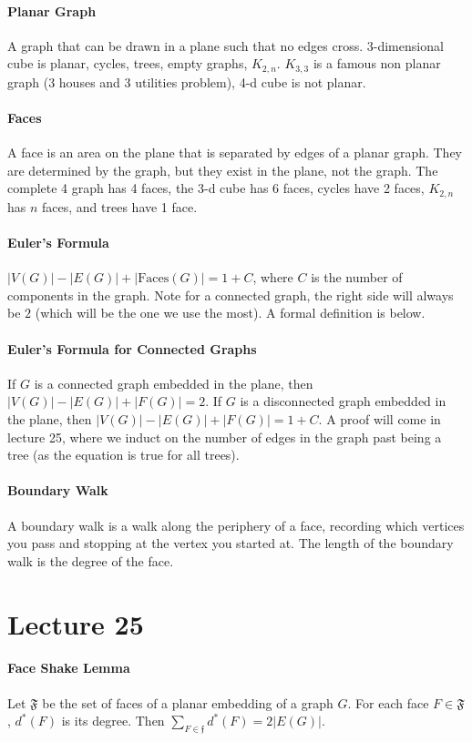 \documentclass[10pt,letter]{article}
\begin{document}
\paragraph{Planar Graph}
A graph that can be drawn in a plane such that no edges cross. 3-dimensional cube is planar, cycles, trees, empty graphs, $K_{2,n}$. $K_{3,3}$ is a famous non planar graph (3 houses and 3 utilities problem), 4-d cube is not planar. 
\paragraph{Faces}
A face is an area on the plane that is separated by edges of a planar graph. They are determined by the graph, but they exist in the plane, not the graph. The complete 4 graph has 4 faces, the 3-d cube has 6 faces, cycles have 2 faces, $K_{2,n}$ has $n$ faces, and trees have 1 face. 
\paragraph{Euler's Formula} 
$|V(G)|-|E(G)|+|\text{Faces}(G)|=1+C$, where $C$ is the number of components in the graph. Note for a connected graph, the right side will always be $2$ (which will be the one we use the most). A formal definition is below.
\paragraph{Euler's Formula for Connected Graphs}
If $G$ is a connected graph embedded in the plane, then $|V(G)|-|E(G)|+|F(G)|=2$. If $G$ is a disconnected graph embedded in the plane, then $|V(G)|-|E(G)|+|F(G)|=1+C$. A proof will come in lecture 25, where we induct on the number of edges in the graph past being a tree (as the equation is true for all trees). 
\paragraph{Boundary Walk}
A boundary walk is a walk along the periphery of a face, recording which vertices you pass and stopping at the vertex you started at. The length of the boundary walk is the degree of the face. 

\section*{Lecture 25}
\paragraph{Face Shake Lemma}
Let $\mathfrak{F}$ be the set of faces of a planar embedding of a graph $G$. For each face $F\in\mathfrak{F}$, $d^*(F)$ is its degree. Then $\sum_{F\in\mathfrak{f}}d^*(F)=2|E(G)|$. 
\end{document}
